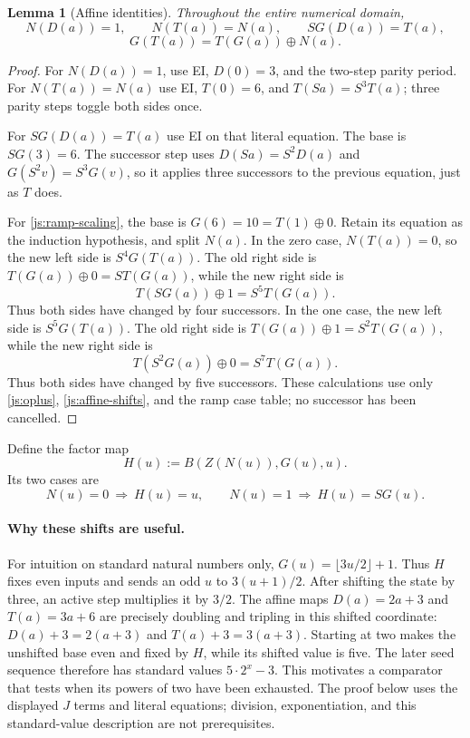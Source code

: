\documentclass[11pt]{article}
\newtheorem{lemma}[theorem]{Lemma}
\theoremstyle{definition}
\begin{document}
\begin{lemma}[Affine identities]\label{js:affine-lemmas}
Throughout the entire numerical domain,
\[
 N(D(a))=1,\qquad N(T(a))=N(a),\qquad
 S G(D(a))=T(a),
 \tag{Affine parity and ramp}\label{js:affine-parity}
\]
\[
 G(T(a))=T(G(a))\oplus N(a).
 \tag{Ramp scaling}\label{js:ramp-scaling}
\]
\end{lemma}
\begin{proof}
For $N(D(a))=1$, use EI, $D(0)=3$, and the two-step parity
period.  For $N(T(a))=N(a)$ use EI, $T(0)=6$, and
$T(Sa)=S^3T(a)$; three parity steps toggle both sides once.

For $S G(D(a))=T(a)$ use EI on that literal equation.  The base
is $S G(3)=6$.  The successor step uses
$D(Sa)=S^2D(a)$ and $G(S^2v)=S^3G(v)$, so it applies three
successors to the previous equation, just as $T$ does.

For \eqref{js:ramp-scaling}, the base is
$G(6)=10=T(1)\oplus0$.  Retain its equation as the induction
hypothesis, and split $N(a)$.  In the zero case, $N(T(a))=0$,
so the new left side is $S^4G(T(a))$.  The old right side is
$T(G(a))\oplus0=S T(G(a))$, while the new right side is
\[
 T(SG(a))\oplus1=S^5T(G(a)).
\]
Thus both sides have changed by four successors.  In the one case,
the new left side is $S^5G(T(a))$.  The old right side is
$T(G(a))\oplus1=S^2T(G(a))$, while the new right side is
\[
 T(S^2G(a))\oplus0=S^7T(G(a)).
\]
Thus both sides have changed by five successors.  These calculations
use only \eqref{js:oplus}, \eqref{js:affine-shifts}, and the ramp
case table; no successor has been cancelled.
\end{proof}

Define the factor map
\[
 H(u):=B(Z(N(u)),G(u),u).
\]
Its two cases are
\[
 N(u)=0\ \Longrightarrow\ H(u)=u,\qquad
 N(u)=1\ \Longrightarrow\ H(u)=S G(u).
\]

\paragraph{Why these shifts are useful.}
For intuition on standard natural numbers only, $G(u)=\lfloor3u/2\rfloor+1$.
Thus $H$ fixes even inputs and sends an odd $u$ to $3(u+1)/2$.
After shifting the state by three, an active step multiplies it by $3/2$.
The affine maps $D(a)=2a+3$ and $T(a)=3a+6$ are precisely doubling
and tripling in this shifted coordinate: $D(a)+3=2(a+3)$ and
$T(a)+3=3(a+3)$. Starting at two makes the unshifted base even and
fixed by $H$, while its shifted value is five. The later seed sequence
therefore has standard values $5\cdot2^x-3$. This motivates a comparator
that tests when its powers of two have been exhausted. The proof below
uses the displayed $J$ terms and literal equations; division, exponentiation,
and this standard-value description are not prerequisites.
\end{document}
